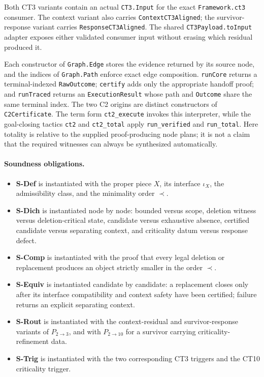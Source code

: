 \documentclass[
  11pt,
]{article}
\providecommand{\tightlist}{%
  \setlength{\itemsep}{0pt}\setlength{\parskip}{0pt}}
\theoremstyle{definition}
\newcommand{\ctpar}[1]{\paragraph{#1.}}
\begin{document}
Both CT3 variants contain an actual \texttt{CT3.Input} for the exact
\texttt{Framework.ct3} consumer.  The context variant also carries
\texttt{ContextCT3Aligned}; the survivor-response variant carries
\texttt{ResponseCT3Aligned}.  The shared \texttt{CT3Payload.toInput}
adapter exposes either validated consumer input without erasing which
residual produced it.

Each constructor of \texttt{Graph.Edge} stores the evidence returned by its
source node, and the indices of \texttt{Graph.Path} enforce exact edge
composition.  \texttt{runCore} returns a terminal-indexed
\texttt{RawOutcome}; \texttt{certify} adds only the appropriate handoff
proof; and \texttt{runTraced} returns an \texttt{ExecutionResult} whose
path and \texttt{Outcome} share the same terminal index.  The two C2
origins are distinct constructors of \texttt{C2Certificate}.  The term
form \texttt{ct2\_execute} invokes this interpreter, while the
goal-closing tactics \texttt{ct2} and \texttt{ct2\_total} apply
\texttt{run\_verified} and \texttt{run\_total}.  Here totality is relative
to the supplied proof-producing node plans; it is not a claim that the
required witnesses can always be synthesized automatically.

\ctpar{Soundness obligations}
\begin{itemize}
\tightlist
\item \textbf{S-Def} is instantiated with the proper piece \(X\), its interface \(\iota_X\), the admissibility class, and the minimality order \(\prec\).
\item \textbf{S-Dich} is instantiated node by node: bounded versus scope, deletion witness versus deletion-critical state, candidate versus exhaustive absence, certified candidate versus separating context, and criticality datum versus response defect.
\item \textbf{S-Comp} is instantiated with the proof that every legal deletion or replacement produces an object strictly smaller in the order \(\prec\).
\item \textbf{S-Equiv} is instantiated candidate by candidate: a replacement closes only after its interface compatibility and context safety have been certified; failure returns an explicit separating context.
\item \textbf{S-Rout} is instantiated with the context-residual and survivor-response variants of \(P_{2\to3}\), and with \(P_{2\to10}\) for a survivor carrying criticality-refinement data.
\item \textbf{S-Trig} is instantiated with the two corresponding CT3 triggers and the CT10 criticality trigger.
\end{itemize}
\end{document}
